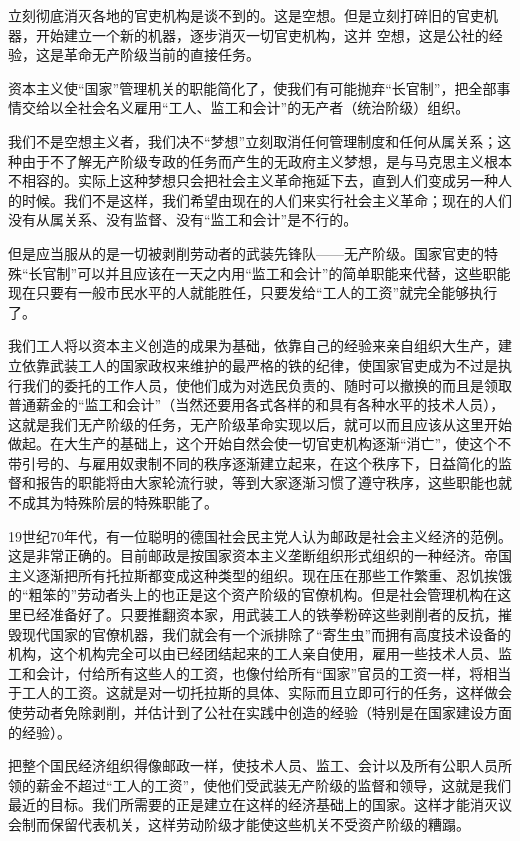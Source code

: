 立刻彻底消灭各地的官吏机构是谈不到的。这是空想。但是立刻{\kaishu 打碎}旧的官吏机器，开始建立一个新的机器，逐步消灭一切官吏机构，这并 空想，这是公社的经验，这是革命无产阶级当前的直接任务。

资本主义使“国家”管理机关的职能简化了，使我们有可能抛弃“长官制”，把全部事情交给以全社会名义雇用“工人、监工和会计”的无产者（统治阶级）组织。

我们不是空想主义者，我们决不“梦想”{\kaishu 立刻}取消任何管理制度和任何从属关系；这种由于不了解无产阶级专政的任务而产生的无政府主义梦想，是与马克思主义根本不相容的。实际上这种梦想只会把社会主义革命拖延下去，直到人们变成另一种人的时候。我们不是这样，我们希望由现在的人们来实行社会主义革命；现在的人们没有从属关系、没有监督、没有“监工和会计”是不行的。

但是应当服从的是一切被剥削劳动者的武装先锋队——无产阶级。国家官吏的特殊“长官制”可以并且应该在一天之内用“监工和会计”的简单职能来代替，这些职能现在只要有一般市民水平的人就能胜任，只要发给“工人的工资”就完全能够执行了。

我们工人将以资本主义创造的成果为基础，依靠自己的经验来{\kaishu 亲自}组织大生产，建立依靠武装工人的国家政权来维护的最严格的铁的纪律，使国家官吏成为不过是执行我们的委托的工作人员，使他们成为对选民负责的、随时可以撤换的而且是领取普通薪金的“监工和会计”（当然还要用各式各样的和具有各种水平的技术人员），这就是{\kaishu 我们}无产阶级的任务，无产阶级革命实现以后，就可以而且应该从这里{\kaishu 开始}做起。在大生产的基础上，这个开始自然会使一切官吏机构逐渐“消亡”，使这个不带引号的、与雇用奴隶制不同的秩序逐渐建立起来，在这个秩序下，日益简化的监督和报告的职能将由大家轮流行驶，等到大家逐渐习惯了遵守秩序，这些职能也就不成其为特殊阶层的{\kaishu 特殊}职能了。

19世纪70年代，有一位聪明的德国社会民主党人认为{\kaishu 邮政}是社会主义经济的范例。这是非常正确的。目前邮政是按国家{\kaishu 资本主义}垄断组织形式组织的一种经济。帝国主义逐渐把所有托拉斯都变成这种类型的组织。现在压在那些工作繁重、忍饥挨饿的“粗笨的”劳动者头上的也正是这个资产阶级的官僚机构。但是社会管理机构在这里已经准备好了。只要推翻资本家，用武装工人的铁拳粉碎这些剥削者的反抗，摧毁现代国家的官僚机器，我们就会有一个派排除了“寄生虫”而拥有高度技术设备的机构，这个机构完全可以由已经团结起来的工人亲自使用，雇用一些技术人员、监工和会计，付给{\kaishu 所有}这些人的工资，也像付给{\kaishu 所有}“国家”官员的工资一样，将相当于工人的工资。这就是对一切托拉斯的具体、实际而且立即可行的任务，这样做会使劳动者免除剥削，并估计到了公社在实践中创造的经验（特别是在国家建设方面的经验）。

把{\kaishu 整个}国民经济组织得像邮政一样，使技术人员、监工、会计以及{\kaishu 所有}公职人员所领的薪金不超过“工人的工资”，使他们受武装无产阶级的监督和领导，这就是我们最近的目标。我们所需要的正是建立在这样的经济基础上的国家。这样才能消灭议会制而保留代表机关，这样劳动阶级才能使这些机关不受资产阶级的糟蹋。










